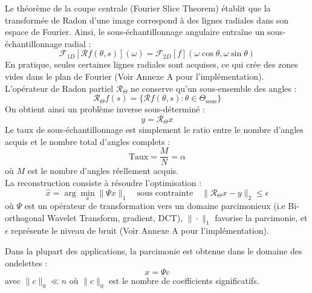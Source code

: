 Le théorème de la coupe centrale (Fourier Slice Theorem) établit que la transformée de Radon d'une image correspond à des lignes radiales dans son espace de Fourier. Ainsi, le sous-échantillonnage angulaire entraîne un sous-échantillonnage radial :
\begin{equation}
\mathcal{F}_{1D}[\mathcal{R}f(\theta, s)](\omega) = \mathcal{F}_{2D}[f](\omega \cos\theta, \omega \sin\theta)
\end{equation}
En pratique, seules certaines lignes radiales sont acquises, ce qui crée des zones vides dans le plan de Fourier (Voir Annexe A pour l'implémentation).\\

L'opérateur de Radon partiel \(\mathcal{R}_{\Theta}\) ne conserve qu'un sous-ensemble des angles :
\begin{equation}
\mathcal{R}_{\Theta}f(s) = \{\mathcal{R}f(\theta, s) : \theta \in \Theta_{\text{sous}}\}
\end{equation}
On obtient ainsi un problème inverse sous-déterminé :
\begin{equation}
y = \mathcal{R}_{\Theta}x
\end{equation}
Le taux de sous-échantillonnage est simplement le ratio entre le nombre d'angles acquis et le nombre total d'angles complets :
\begin{equation}
\text{Taux} = \frac{M}{N} = \alpha
\end{equation}
où \(M\) est le nombre d'angles réellement acquis.\\

La reconstruction consiste à résoudre l'optimisation :
\begin{equation}
\hat{x} = \arg\min_{x} \|\Psi x\|_1 \quad \text{sous contrainte} \quad \|\mathcal{R}_{\Theta}x - y\|_2 \leq \epsilon
\end{equation}
où \(\Psi\) est un opérateur de transformation vers un domaine parcimonieux (i.e Bi-orthogonal Wavelet Transform, gradient, DCT), \(\|\cdot\|_1\) favorise la parcimonie, et \(\epsilon\) représente le niveau de bruit (Voir Annexe A pour l'implémentation).  

Dans la plupart des applications, la parcimonie est obtenue dans le domaine des ondelettes :
\begin{equation}
x = \Psi c
\end{equation}
avec \(\|c\|_0 \ll n\) où \(\|c\|_0\) est le nombre de coefficients significatifs.\\

